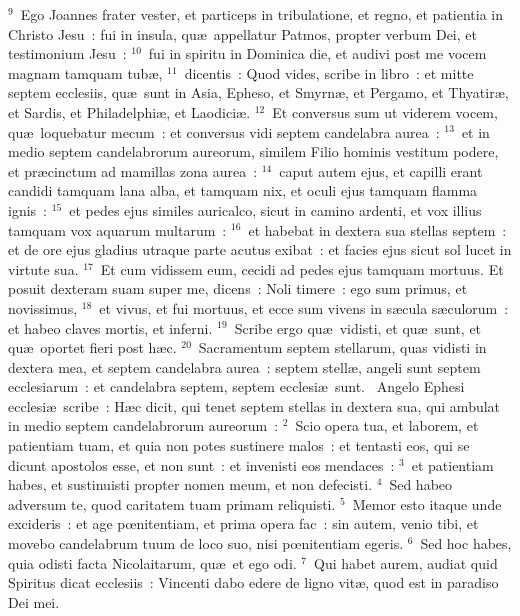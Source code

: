 ${}^{9}$~Ego Joannes frater vester, et particeps in tribulatione, et regno, et patientia in Christo Jesu~: fui in insula, qu\ae\ appellatur Patmos, propter verbum Dei, et testimonium Jesu~:
${}^{10}$~fui in spiritu in Dominica die, et audivi post me vocem magnam tamquam tub\ae ,
${}^{11}$~dicentis~: Quod vides, scribe in libro~: et mitte septem ecclesiis, qu\ae\ sunt in Asia, Epheso, et Smyrn\ae , et Pergamo, et Thyatir\ae , et Sardis, et Philadelphi\ae , et Laodici\ae .
${}^{12}$~Et conversus sum ut viderem vocem, qu\ae\ loquebatur mecum~: et conversus vidi septem candelabra aurea~:
${}^{13}$~et in medio septem candelabrorum aureorum, similem Filio hominis vestitum podere, et pr\ae cinctum ad mamillas zona aurea~:
${}^{14}$~caput autem ejus, et capilli erant candidi tamquam lana alba, et tamquam nix, et oculi ejus tamquam flamma ignis~:
${}^{15}$~et pedes ejus similes auricalco, sicut in camino ardenti, et vox illius tamquam vox aquarum multarum~:
${}^{16}$~et habebat in dextera sua stellas septem~: et de ore ejus gladius utraque parte acutus exibat~: et facies ejus sicut sol lucet in virtute sua.
${}^{17}$~Et cum vidissem eum, cecidi ad pedes ejus tamquam mortuus. Et posuit dexteram suam super me, dicens~: Noli timere~: ego sum primus, et novissimus,
${}^{18}$~et vivus, et fui mortuus, et ecce sum vivens in s\ae cula s\ae culorum~: et habeo claves mortis, et inferni.
${}^{19}$~Scribe ergo qu\ae\ vidisti, et qu\ae\ sunt, et qu\ae\ oportet fieri post h\ae c.
${}^{20}$~Sacramentum septem stellarum, quas vidisti in dextera mea, et septem candelabra aurea~: septem stell\ae , angeli sunt septem ecclesiarum~: et candelabra septem, septem ecclesi\ae\ sunt.
~\lettrine[lines=10,image=true,loversize=0.05,lraise=-0.03]{A}{}ngelo Ephesi ecclesi\ae\ scribe~: H\ae c dicit, qui tenet septem stellas in dextera sua, qui ambulat in medio septem candelabrorum aureorum~:
${}^{2}$~Scio opera tua, et laborem, et patientiam tuam, et quia non potes sustinere malos~: et tentasti eos, qui se dicunt apostolos esse, et non sunt~: et invenisti eos mendaces~:
${}^{3}$~et patientiam habes, et sustinuisti propter nomen meum, et non defecisti.
${}^{4}$~Sed habeo adversum te, quod caritatem tuam primam reliquisti.
${}^{5}$~Memor esto itaque unde excideris~: et age pœnitentiam, et prima opera fac~: sin autem, venio tibi, et movebo candelabrum tuum de loco suo, nisi pœnitentiam egeris.
${}^{6}$~Sed hoc habes, quia odisti facta Nicolaitarum, qu\ae\ et ego odi.
${}^{7}$~Qui habet aurem, audiat quid Spiritus dicat ecclesiis~: Vincenti dabo edere de ligno vit\ae , quod est in paradiso Dei mei.


